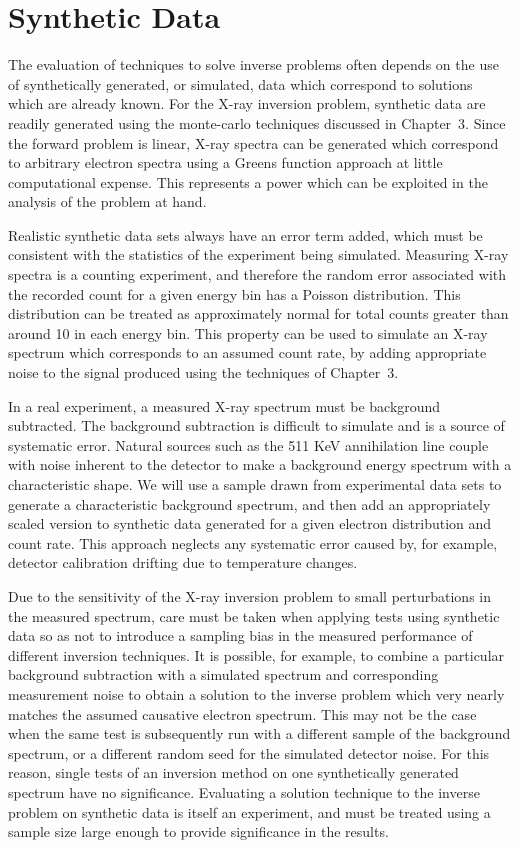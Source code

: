 \section{Synthetic Data}

The evaluation of techniques to solve inverse problems often depends on the use of synthetically generated, or simulated, data which correspond to solutions which are already known. For the X-ray inversion problem, synthetic data are readily generated using the monte-carlo techniques discussed in Chapter~3. Since the forward problem is linear, X-ray spectra can be generated which correspond to arbitrary electron spectra using a Greens function approach at little computational expense. This represents a power which can be exploited in the analysis of the problem at hand.  

Realistic synthetic data sets always have an error term added, which must be consistent with the statistics of the experiment being simulated. Measuring X-ray spectra is a counting experiment, and therefore the random error associated with the recorded count for a given energy bin has a Poisson distribution. This distribution can be treated as approximately normal for total counts greater than around 10 in each energy bin. This property can be used to simulate an X-ray spectrum which corresponds to an assumed count rate, by adding appropriate noise to the signal produced using the techniques of Chapter~3.

In a real experiment, a measured X-ray spectrum must be background subtracted. The background subtraction is difficult to simulate and is a source of systematic error. Natural sources such as the 511 KeV annihilation line couple with noise inherent to the detector to make a background energy spectrum with a characteristic shape. We will use a sample drawn from experimental data sets to generate a characteristic background spectrum, and then add an appropriately scaled version to synthetic data generated for a given electron distribution and count rate. This approach neglects any systematic error caused by, for example, detector calibration drifting due to temperature changes. 

Due to the sensitivity of the X-ray inversion problem to small perturbations in the measured spectrum, care must be taken when applying tests using synthetic data so as not to introduce a sampling bias in the measured performance of different inversion techniques. It is possible, for example, to combine a particular background subtraction with a simulated spectrum and corresponding measurement noise to obtain a solution to the inverse problem which very nearly matches the assumed causative electron spectrum. This may not be the case when the same test is subsequently run with a different sample of the background spectrum, or a different random seed for the simulated detector noise. For this reason, single tests of an inversion method on one synthetically generated spectrum have no significance. Evaluating a solution technique to the inverse problem on synthetic data is itself an experiment, and must be treated using a sample size large enough to provide significance in the results. 

